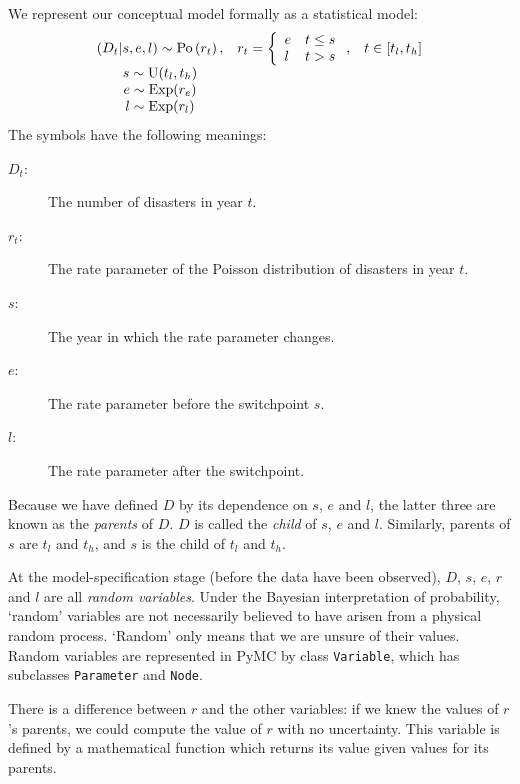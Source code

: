 We represent our conceptual model formally as a statistical model:
\begin{equation}
    \begin{array}{ccc}
        (D_t | s, e, l) \sim \textup{Po}\left(r_t\right), & r_t=\left\{\begin{array}{ll}
            e & t\le s\\ l & t>s
            \end{array}\right.,&t\in[t_l,t_h]\\
        s\sim \textup{U}(t_l, t_h)\\
        e\sim \textup{Exp}(r_e)\\
        l\sim \textup{Exp}(r_l)        
    \end{array}
    \label{disastermodel} 
\end{equation}
The symbols have the following meanings:
\begin{description}
    \item[$D_t$:] The number of disasters in year $t$.
    \item[$r_t$:] The rate parameter of the Poisson distribution of disasters in year $t$.
    \item[$s$:] The year in which the rate parameter changes.
    \item[$e$:] The rate parameter before the switchpoint $s$.
    \item[$l$:] The rate parameter after the switchpoint.
\end{description}
Because we have defined $D$ by its dependence on $s$, $e$ and $l$, the latter three are known as the \emph{parents} of $D$. $D$ is called the \emph{child} of $s$, $e$ and $l$. Similarly, parents of $s$ are $t_l$ and $t_h$, and $s$ is the child of $t_l$ and $t_h$.

At the model-specification stage (before the data have been observed), $D$, $s$, $e$, $r$ and $l$ are all \emph{random variables}. Under the Bayesian interpretation of probability, `random' variables are not necessarily believed to have arisen from a physical random process. `Random' only means that we are unsure of their values. Random variables are represented in PyMC by class \texttt{Variable}, which has subclasses \texttt{Parameter} and \texttt{Node}.

There is a difference between $r$ and the other variables: if we knew the values of $r$'s parents, we could compute the value of $r$ with no uncertainty. This variable is defined by a mathematical function which returns its value given values for its parents. 


